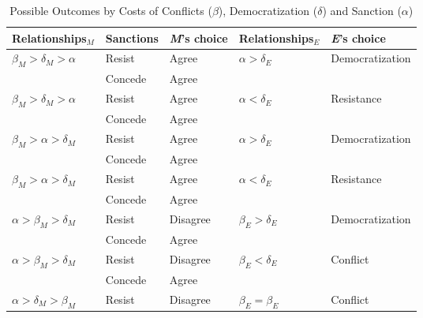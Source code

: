 \documentclass[11pt]{article}
\begin{document}
\begin{table}[!ht]
	\centering
	\caption{Possible Outcomes by Costs of Conflicts ($\beta$), Democratization ($\delta$) and Sanction ($\alpha$)}
	\footnotesize
	\vspace{0.2cm}
	\begin{tabular}{ p{3cm} p{2cm} p{2cm} p{3cm} p{3cm} }
		\toprule
		\multicolumn{1}{p{3cm}}{Relationships$_{M}$} & \multicolumn{1}{p{2cm}}{Sanctions} & \multicolumn{1}{p{2cm}}{\textit{M}'s choice} & \multicolumn{1}{p{3cm}}{Relationships$_{E}$} & \multicolumn{1}{p{3cm}}{\textit{E}'s choice} \\
		\midrule
		\rowcolor{Gray}
		$\beta_{M} > \delta_{M} > \alpha$	& Resist   & Agree    & $\alpha > \delta_{E}$ & Democratization\\
		\rowcolor{Gray}
		                                      & Concede  & Agree    &                           &                \\
    $\beta_{M} > \delta_{M} > \alpha$	& Resist   & Agree    & $\alpha < \delta_{E}$ & Resistance     \\
		                                      & Concede  & Agree    &                           &                \\
    \rowcolor{Gray}
		$\beta_{M} > \alpha > \delta_{M}$	& Resist   & Agree    & $\alpha > \delta_{E}$ & Democratization\\
		\rowcolor{Gray}
		                                      & Concede  & Agree    &                           &                \\
		$\beta_{M} > \alpha > \delta_{M}$	& Resist   & Agree    & $\alpha < \delta_{E}$ & Resistance     \\
		                                      & Concede  & Agree    &                           &                \\
		\rowcolor{Gray}
    $\alpha > \beta_{M} > \delta_{M}$	& Resist   & Disagree & $\beta_{E} > \delta_{E}$  & Democratization\\
    \rowcolor{Gray}
		                                      & Concede  & Agree    &                           &                \\
    $\alpha > \beta_{M} > \delta_{M}$	& Resist   & Disagree & $\beta_{E} < \delta_{E}$  & Conflict     \\
                                          & Concede  & Agree    &                           &                \\
		$\alpha > \delta_{M} > \beta_{M}$	& Resist   & Disagree  & $\beta_{E} = \beta_{E}$   & Conflict \\

\end{tabular}
\end{table}
\end{document}

